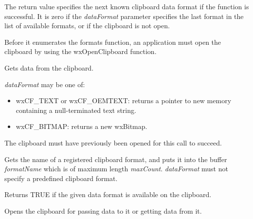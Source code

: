 The return value specifies the next known clipboard data format if the
function is successful. It is zero if the {\it dataFormat} parameter specifies
the last  format in the list of available formats, or if the clipboard
is not open.

Before it enumerates the formats function, an application must open the clipboard by using the
wxOpenClipboard function.

\label{wxgetclipboarddata}


Gets data from the clipboard.

{\it dataFormat} may be one of:

\begin{itemize}\itemsep=0pt
\item wxCF\_TEXT or wxCF\_OEMTEXT: returns a pointer to new memory containing a null-terminated text string.
\item wxCF\_BITMAP: returns a new wxBitmap.
\end{itemize}

The clipboard must have previously been opened for this call to succeed.

\label{wxgetclipboardformatname}


Gets the name of a registered clipboard format, and puts it into the buffer {\it formatName} which is of maximum
length {\it maxCount}. {\it dataFormat} must not specify a predefined clipboard format.

\label{wxisclipboardformatavailable}


Returns TRUE if the given data format is available on the clipboard.

\label{wxopenclipboard}


Opens the clipboard for passing data to it or getting data from it.

\label{wxregisterclipboardformat}


